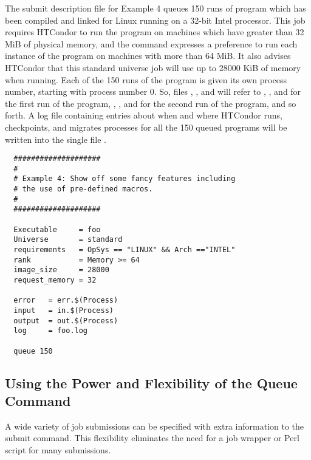 The submit description file for Example 4 queues 150
runs of program  which has been compiled and linked for
Linux running on a 32-bit Intel processor.
This job requires HTCondor to run the program on machines which have
greater than 32 MiB of physical memory, 
and the  command expresses a
preference to run each instance of the program 
on machines with more than 64 MiB.
It also advises HTCondor that this standard universe job will
use up to 28000 KiB of memory when running.
Each of the 150 runs of the program is given its own process number,
starting with process number 0.
So, files 
, , and  will
refer to , , and  for the first run
of the program,
, ,
and  for the second run of the program, and so forth.
A log file containing entries
about when and where HTCondor runs, checkpoints, and migrates processes for
all the 150 queued programs
will be written into the single file .
\begin{verbatim}
  ####################                    
  #
  # Example 4: Show off some fancy features including
  # the use of pre-defined macros.
  #
  ####################                                                    

  Executable     = foo                                                    
  Universe       = standard                                                    
  requirements   = OpSys == "LINUX" && Arch =="INTEL"     
  rank           = Memory >= 64
  image_size     = 28000
  request_memory = 32

  error   = err.$(Process)                                                
  input   = in.$(Process)                                                 
  output  = out.$(Process)                                                
  log     = foo.log

  queue 150
\end{verbatim}


\subsection{\label{sec:user-man-queue}Using the Power and Flexibility of the Queue Command}
\MoreTodo

A wide variety of job submissions can be specified
with extra information to the  submit command.
This flexibility eliminates the need for a job wrapper or Perl script 
for many submissions.

